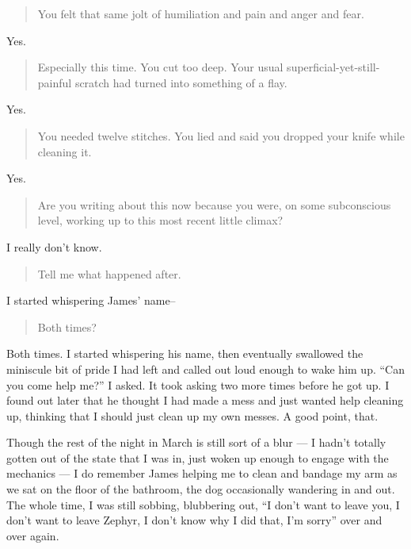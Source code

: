 \begin{quote}
You felt that same jolt of humiliation and pain and anger and fear.
\end{quote}

Yes.

\begin{quote}
Especially this time. You cut too deep. Your usual superficial-yet-still-painful scratch had turned into something of a flay.
\end{quote}

Yes.

\begin{quote}
You needed twelve stitches. You lied and said you dropped your knife while cleaning it.
\end{quote}

Yes.

\begin{quote}
Are you writing about this now because you were, on some subconscious level, working up to this most recent little climax?
\end{quote}

I really don't know.

\begin{quote}
Tell me what happened after.
\end{quote}

I started whispering James' name--

\begin{quote}
Both times?
\end{quote}

Both times. I started whispering his name, then eventually swallowed the miniscule bit of pride I had left and called out loud enough to wake him up. ``Can you come help me?'' I asked. It took asking two more times before he got up. I found out later that he thought I had made a mess and just wanted help cleaning up, thinking that I should just clean up my own messes. A good point, that.

Though the rest of the night in March is still sort of a blur --- I hadn't totally gotten out of the state that I was in, just woken up enough to engage with the mechanics --- I do remember James helping me to clean and bandage my arm as we sat on the floor of the bathroom, the dog occasionally wandering in and out. The whole time, I was still sobbing, blubbering out, ``I don't want to leave you, I don't want to leave Zephyr, I don't know why I did that, I'm sorry'' over and over again.
